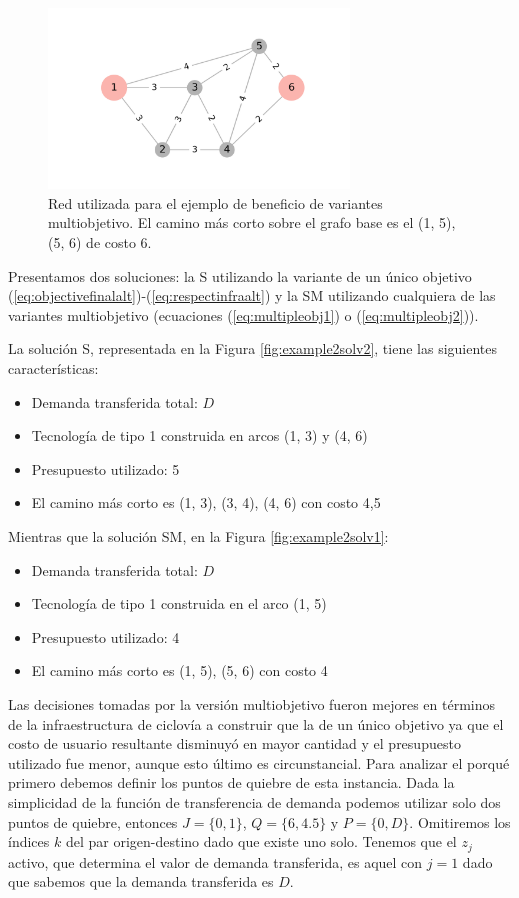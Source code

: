 \begin{figure}[h!]
  \centering
  \includegraphics[width=8cm]{../resources/example_2_base.png}
  \caption{Red utilizada para el ejemplo de beneficio de variantes multiobjetivo. El camino más corto sobre el grafo base es el (1, 5), (5, 6) de costo 6.}
  \label{fig:example2base}
\end{figure}

\FloatBarrier

Presentamos dos soluciones: la S utilizando la variante de un único objetivo (\ref{eq:objectivefinalalt})-(\ref{eq:respectinfraalt}) y la SM utilizando cualquiera de las variantes multiobjetivo (ecuaciones (\ref{eq:multipleobj1}) o (\ref{eq:multipleobj2})).

La solución S, representada en la Figura \ref{fig:example2solv2}, tiene las siguientes características:

\begin{itemize}
  \item{Demanda transferida total: $D$}
  \item{Tecnología de tipo 1 construida en arcos (1, 3) y (4, 6)}
  \item{Presupuesto utilizado: 5}
  \item{El camino más corto es (1, 3), (3, 4), (4, 6) con costo 4,5}
\end{itemize}

Mientras que la solución SM, en la Figura \ref{fig:example2solv1}:

\begin{itemize}
  \item{Demanda transferida total: $D$}
  \item{Tecnología de tipo 1 construida en el arco (1, 5)}
  \item{Presupuesto utilizado: 4}
  \item{El camino más corto es (1, 5), (5, 6) con costo 4}
\end{itemize}

Las decisiones tomadas por la versión multiobjetivo fueron mejores en términos de la infraestructura de ciclovía a construir que la de un único objetivo ya que el costo de usuario resultante disminuyó en mayor cantidad y el presupuesto utilizado fue menor, aunque esto último es circunstancial. Para analizar el porqué primero debemos definir los puntos de quiebre de esta instancia. Dada la simplicidad de la función de transferencia de demanda podemos utilizar solo dos puntos de quiebre, entonces $J = \{0, 1\}$, $Q = \{6, 4.5\}$ y $P = \{0, D\}$. Omitiremos los índices $k$ del par origen-destino dado que existe uno solo. Tenemos que el $z_j$ activo, que determina el valor de demanda transferida, es aquel con $j = 1$ dado que sabemos que la demanda transferida es $D$.

